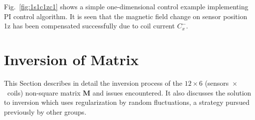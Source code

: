 Fig.~\ref{fig:1s1c1zc1} shows a simple one-dimensional control example implementing PI control algorithm. It is seen that the magnetic field change on sensor position 1z  has been compensated successfully due to coil current $C_x^-$. 


\section{Inversion of Matrix}\label{sec:inv}

This Section describes in detail the inversion process of the $12\times6$ (sensors~$\times$~coils) non-square matrix $\bm{M}$ and issues encountered. It also discusses the solution to inversion which uses regularization by random fluctuations, a strategy pursued previously by other groups. 







